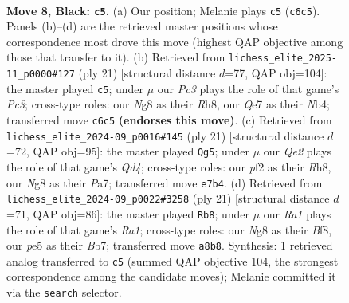 \documentclass[11pt]{article}
\begin{document}
\begin{figure}[p]\centering
\begin{subfigure}{0.46\textwidth}\centering
\resizebox{\linewidth}{!}{%
\newchessgame
\chessboard[
  setfen={r1b1kbnr/p1ppqppp/2p5/4P3/7P/8/PPP1QPP1/RNB1KB1R b KQkq - 0 8},
  showmover=false,
  pgfstyle=straightmove, color=movearrow, markmove={c6-c5}
]}
\caption{}
\end{subfigure}\hfill
\begin{subfigure}{0.46\textwidth}\centering
\resizebox{\linewidth}{!}{%
\newchessgame
\chessboard[
  setfen={r1b1kb1r/2ppqppp/2p5/4P3/pnP4P/5N2/PP2QPP1/R1B1KB1R b KQkq - 2 11},
  showmover=false,
  pgfstyle=straightmove, color=movearrow, markmove={c6-c5}
]}
\caption{}
\end{subfigure}
\\[4pt]
\begin{subfigure}{0.46\textwidth}\centering
\resizebox{\linewidth}{!}{%
\newchessgame
\chessboard[
  setfen={r1b1k2r/pppp1ppp/2n5/3q4/1b2p3/4P3/PP1PBPPP/R1BQK2R b KQkq - 2 11},
  showmover=false,
  pgfstyle=straightmove, color=movearrow, markmove={d5-g5}
]}
\caption{}
\end{subfigure}\hfill
\begin{subfigure}{0.46\textwidth}\centering
\resizebox{\linewidth}{!}{%
\newchessgame
\chessboard[
  setfen={r3kb1r/pb1pqppp/2n5/2ppP3/8/2P2N2/P1P1QPPP/1RB1KB1R b Kkq - 2 11},
  showmover=false,
  pgfstyle=straightmove, color=movearrow, markmove={a8-b8}
]}
\caption{}
\end{subfigure}
\caption{\textbf{Move 8, Black: \texttt{c5}.} (a) Our position; Melanie plays \texttt{c5} (\texttt{c6c5}). Panels (b)--(d) are the retrieved master positions whose correspondence most drove this move (highest QAP objective among those that transfer to it). (b) Retrieved from \texttt{lichess\_elite\_2025-11\_p0000\#127} (ply 21) [structural distance $d$=77, QAP obj=104]: the master played \texttt{c5}; under $\mu$ our \emph{Pc3} plays the role of that game's \emph{Pc3}; cross-type roles: our \emph{N}g8 as their \emph{R}h8, our \emph{Q}e7 as their \emph{N}b4; transferred move \texttt{c6c5} \textbf{(endorses this move)}. (c) Retrieved from \texttt{lichess\_elite\_2024-09\_p0016\#145} (ply 21) [structural distance $d$=72, QAP obj=95]: the master played \texttt{Qg5}; under $\mu$ our \emph{Qe2} plays the role of that game's \emph{Qd4}; cross-type roles: our \emph{p}f2 as their \emph{R}h8, our \emph{N}g8 as their \emph{P}a7; transferred move \texttt{e7b4}. (d) Retrieved from \texttt{lichess\_elite\_2024-09\_p0022\#3258} (ply 21) [structural distance $d$=71, QAP obj=86]: the master played \texttt{Rb8}; under $\mu$ our \emph{Ra1} plays the role of that game's \emph{Ra1}; cross-type roles: our \emph{N}g8 as their \emph{B}f8, our \emph{p}e5 as their \emph{B}b7; transferred move \texttt{a8b8}. Synthesis: 1 retrieved analog transferred to \texttt{c5} (summed QAP objective 104, the strongest correspondence among the candidate moves); Melanie committed it via the \texttt{search} selector.}
\label{fig:thought-m15}
\end{figure}
\end{document}
